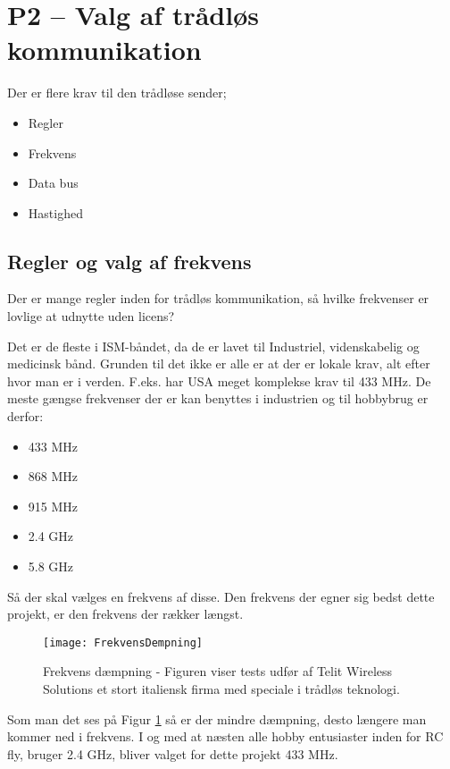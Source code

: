 \documentclass[Main]{subfiles}
\begin{document}
\section[Valg af trådløs kommunikation]{P2 -- Valg af trådløs kommunikation}

Der er flere krav til den trådløse sender;

\begin{itemize}
\item Regler
\item Frekvens
\item Data bus
\item Hastighed
\end{itemize}

\subsection{Regler og valg af frekvens}
Der er mange regler inden for trådløs kommunikation, så hvilke frekvenser er lovlige at udnytte uden licens?

Det er de fleste i ISM-båndet, da de er lavet til  Industriel, videnskabelig og medicinsk bånd. 
Grunden til det ikke er alle er at der er lokale krav, alt efter hvor man er i verden. 
F.eks. har USA meget komplekse krav til 433 MHz\cite[s. 32]{Lov1}.
De meste gængse frekvenser der er kan benyttes i industrien og til hobbybrug er derfor:

\begin{itemize}
\item 433 MHz
\item 868 MHz
\item 915 MHz
\item 2.4 GHz
\item 5.8 GHz
\end{itemize}

Så der skal vælges en frekvens af disse.
Den frekvens der egner sig bedst dette projekt, er den frekvens der rækker længst. 

\begin{figure}[H]
\centering
\texttt{[image: FrekvensDempning]}
\caption{Frekvens dæmpning - Figuren viser tests udfør af Telit Wireless Solutions\cite[s. 43]{Telit} et stort italiensk firma med speciale i trådløs teknologi.}
\label{Fig:dempning}
\end{figure}


Som man det ses på Figur \ref{Fig:dempning} så er der mindre dæmpning, desto længere man kommer ned i frekvens.
I og med at næsten alle hobby entusiaster inden for RC fly, bruger 2.4 GHz, bliver valget for dette projekt 433 MHz.
\end{document}

